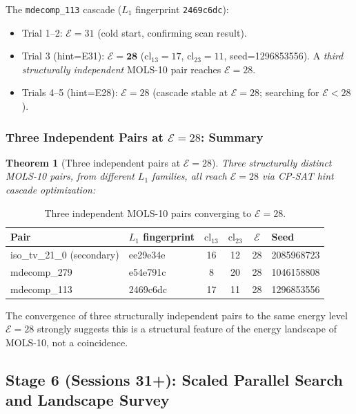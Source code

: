 \documentclass[11pt,a4paper]{article}
\newtheorem{theorem}{Theorem}[section]
\theoremstyle{remark}
\newcommand{\cl}{\mathrm{cl}}
\newcommand{\E}{\mathcal{E}}
\begin{document}
The \texttt{mdecomp\_113} cascade ($L_1$ fingerprint \texttt{2469c6dc}):
\begin{itemize}[noitemsep]
  \item Trial 1--2: $\E=31$ (cold start, confirming scan result).
  \item Trial 3 (hint=E31): $\E=\mathbf{28}$ ($\cl_{13}=17$, $\cl_{23}=11$,
    seed=1296853556). A \emph{third structurally independent} MOLS-10 pair reaches $\E=28$.
  \item Trials 4--5 (hint=E28): $\E=28$ (cascade stable at $\E=28$; searching for $\E<28$).
\end{itemize}

\subsubsection{Three Independent Pairs at $\E=28$: Summary}

\begin{theorem}[Three independent pairs at $\E=28$]\label{thm:three_pairs}
Three structurally distinct MOLS-10 pairs, from different $L_1$ families, all reach
$\E = 28$ via CP-SAT hint cascade optimization:
\end{theorem}

\begin{table}[h]
\centering
\caption{Three independent MOLS-10 pairs converging to $\E=28$.}\label{tab:e28}
\begin{tabular}{llcccl}
\toprule
Pair & $L_1$ fingerprint & $\cl_{13}$ & $\cl_{23}$ & $\E$ & Seed\\
\midrule
iso\_tv\_21\_0 (secondary) & ee29e34e & 16 & 12 & 28 & 2085968723\\
mdecomp\_279 & e54e791c & 8 & 20 & 28 & 1046158808\\
mdecomp\_113 & 2469c6dc & 17 & 11 & 28 & 1296853556\\
\bottomrule
\end{tabular}
\end{table}

The convergence of three structurally independent pairs to the same energy level $\E=28$
strongly suggests this is a structural feature of the energy landscape of MOLS-10, not
a coincidence.

\subsection{Stage 6 (Sessions 31+): Scaled Parallel Search and Landscape Survey}
\end{document}
